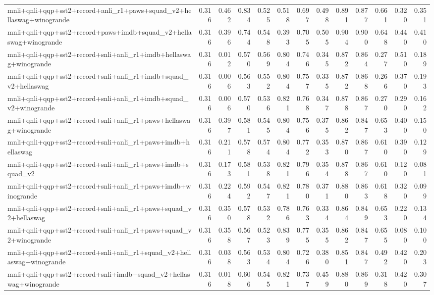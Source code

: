 \begin{table}[t]
\begin{tabular}{lrrrrrrrrrrrr}
    mnli+qnli+qqp+sst2+record+anli\_r1+paws+squad\_v2+hellaswag+winogrande & 0.316 & 0.462 & 0.834 & 0.525 & 0.518 & 0.697 & 0.498 & 0.891 & 0.877 & 0.661 & 0.320 & 0.351 \\
    mnli+qnli+qqp+sst2+record+paws+imdb+squad\_v2+hellaswag+winogrande & 0.316 & 0.396 & 0.744 & 0.548 & 0.393 & 0.705 & 0.505 & 0.904 & 0.900 & 0.648 & 0.440 & 0.410 \\
    mnli+qnli+qqp+sst2+record+snli+anli\_r1+imdb+hellaswag+winogrande & 0.316 & 0.012 & 0.570 & 0.569 & 0.804 & 0.746 & 0.345 & 0.872 & 0.864 & 0.277 & 0.510 & 0.189 \\
    mnli+qnli+qqp+sst2+record+snli+anli\_r1+imdb+squad\_v2+hellaswag & 0.316 & 0.006 & 0.563 & 0.552 & 0.804 & 0.757 & 0.335 & 0.872 & 0.868 & 0.266 & 0.370 & 0.193 \\
    mnli+qnli+qqp+sst2+record+snli+anli\_r1+imdb+squad\_v2+winogrande & 0.316 & 0.006 & 0.570 & 0.536 & 0.821 & 0.768 & 0.347 & 0.878 & 0.867 & 0.270 & 0.290 & 0.162 \\
    mnli+qnli+qqp+sst2+record+snli+anli\_r1+paws+hellaswag+winogrande & 0.316 & 0.397 & 0.581 & 0.545 & 0.804 & 0.756 & 0.375 & 0.862 & 0.847 & 0.653 & 0.400 & 0.150 \\
    mnli+qnli+qqp+sst2+record+snli+anli\_r1+paws+imdb+hellaswag & 0.316 & 0.211 & 0.578 & 0.574 & 0.804 & 0.772 & 0.353 & 0.870 & 0.867 & 0.610 & 0.390 & 0.129 \\
    mnli+qnli+qqp+sst2+record+snli+anli\_r1+paws+imdb+squad\_v2 & 0.316 & 0.173 & 0.581 & 0.538 & 0.821 & 0.796 & 0.354 & 0.878 & 0.867 & 0.610 & 0.120 & 0.081 \\
    mnli+qnli+qqp+sst2+record+snli+anli\_r1+paws+imdb+winogrande & 0.316 & 0.224 & 0.592 & 0.547 & 0.821 & 0.780 & 0.371 & 0.880 & 0.863 & 0.618 & 0.320 & 0.099 \\
    mnli+qnli+qqp+sst2+record+snli+anli\_r1+paws+squad\_v2+hellaswag & 0.316 & 0.350 & 0.578 & 0.532 & 0.786 & 0.763 & 0.334 & 0.864 & 0.849 & 0.653 & 0.220 & 0.134 \\
    mnli+qnli+qqp+sst2+record+snli+anli\_r1+paws+squad\_v2+winogrande & 0.316 & 0.358 & 0.567 & 0.523 & 0.839 & 0.775 & 0.355 & 0.862 & 0.847 & 0.655 & 0.080 & 0.100 \\
    mnli+qnli+qqp+sst2+record+snli+anli\_r1+squad\_v2+hellaswag+winogrande & 0.316 & 0.038 & 0.563 & 0.534 & 0.804 & 0.726 & 0.380 & 0.851 & 0.847 & 0.492 & 0.420 & 0.203 \\
    mnli+qnli+qqp+sst2+record+snli+imdb+squad\_v2+hellaswag+winogrande & 0.316 & 0.018 & 0.606 & 0.545 & 0.821 & 0.737 & 0.459 & 0.880 & 0.869 & 0.318 & 0.420 & 0.307 \\

\end{tabular}
\end{table}
